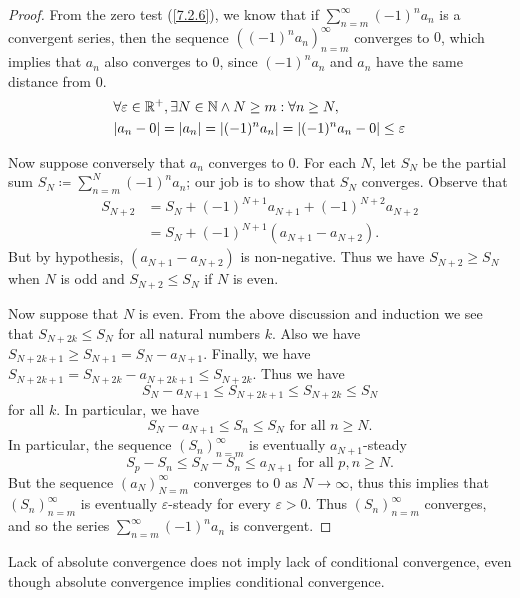 \begin{proof}
  From the zero test (\cref{7.2.6}), we know that if \(\sum_{n = m}^\infty (-1)^n a_n\) is a convergent series, then the sequence \(((-1)^n a_n)_{n = m}^\infty\) converges to \(0\), which implies that \(a_n\) also converges to \(0\), since \((-1)^n a_n\) and \(a_n\) have the same distance from \(0\).
  \begin{align*}
     & \forall \varepsilon \in \R^+, \exists N \in \N \land N \geq m : \forall n \geq N,    \\
     & \abs{a_n - 0} = \abs{a_n} = \abs{(-1)^n a_n} = \abs{(-1)^n a_n - 0} \leq \varepsilon
  \end{align*}

  Now suppose conversely that \(a_n\) converges to \(0\).
  For each \(N\), let \(S_N\) be the partial sum \(S_N \coloneqq \sum_{n = m}^N (-1)^n a_n\);
  our job is to show that \(S_N\) converges.
  Observe that
  \begin{align*}
    S_{N + 2} & = S_N + (-1)^{N + 1} a_{N + 1} + (-1)^{N + 2} a_{N + 2} \\
              & = S_N + (-1)^{N + 1} (a_{N + 1} - a_{N + 2}).
  \end{align*}
  But by hypothesis, \((a_{N + 1} - a_{N + 2})\) is non-negative.
  Thus we have \(S_{N + 2} \geq S_N\) when \(N\) is odd and \(S_{N + 2} \leq S_N\) if \(N\) is even.

  Now suppose that \(N\) is even.
  From the above discussion and induction we see that \(S_{N + 2k} \leq S_N\) for all natural numbers \(k\).
  Also we have \(S_{N + 2k + 1} \geq S_{N + 1} = S_N - a_{N + 1}\).
  Finally, we have \(S_{N + 2k + 1} = S_{N + 2k} - a_{N + 2k + 1} \leq S_{N + 2k}\).
  Thus we have
  \[
    S_N - a_{N + 1} \leq S_{N + 2k + 1} \leq S_{N + 2k} \leq S_N
  \]
  for all \(k\).
  In particular, we have
  \[
    S_N - a_{N + 1} \leq S_n \leq S_N \text{ for all } n \geq N.
  \]
  In particular, the sequence \((S_n)_{n = m}^\infty\) is eventually \(a_{N + 1}\)-steady
  \[
    S_p - S_n \leq S_N - S_n \leq a_{N + 1} \text{ for all } p, n \geq N.
  \]
  But the sequence \((a_N)_{N = m}^\infty\) converges to \(0\) as \(N \to \infty\), thus this implies that \((S_n)_{n = m}^\infty\) is eventually \(\varepsilon\)-steady for every \(\varepsilon > 0\).
  Thus \((S_n)_{n = m}^\infty\) converges, and so the series \(\sum_{n = m}^\infty (-1)^n a_n\) is convergent.
\end{proof}

\begin{note}
  Lack of absolute convergence does not imply lack of conditional convergence, even though absolute convergence implies conditional convergence.
\end{note}

